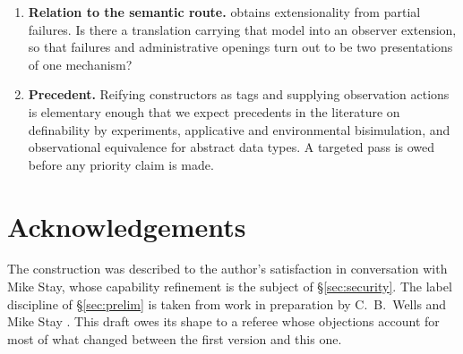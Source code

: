 \documentclass[11pt]{article}
\theoremstyle{plain}
\theoremstyle{definition}
\begin{document}
\begin{enumerate}
\item \textbf{Relation to the semantic route.} \cite{CairesVieira} obtains extensionality from partial
failures. Is there a translation carrying that model into an observer extension, so that failures and
administrative openings turn out to be two presentations of one mechanism?

\item \textbf{Precedent.} Reifying constructors as tags and supplying observation actions is elementary
enough that we expect precedents in the literature on definability by experiments, applicative and
environmental bisimulation, and observational equivalence for abstract data types. A targeted pass is
owed before any priority claim is made.
\end{enumerate}

\section*{Acknowledgements}

The construction was described to the author's satisfaction in conversation with Mike Stay, whose
capability refinement is the subject of \S\ref{sec:security}. The label discipline of
\S\ref{sec:prelim} is taken from work in preparation by C.\ B.\ Wells and Mike Stay \cite{BIHOL}. This
draft owes its shape to a referee whose objections account for most of what changed between the first
version and this one.
\end{document}
